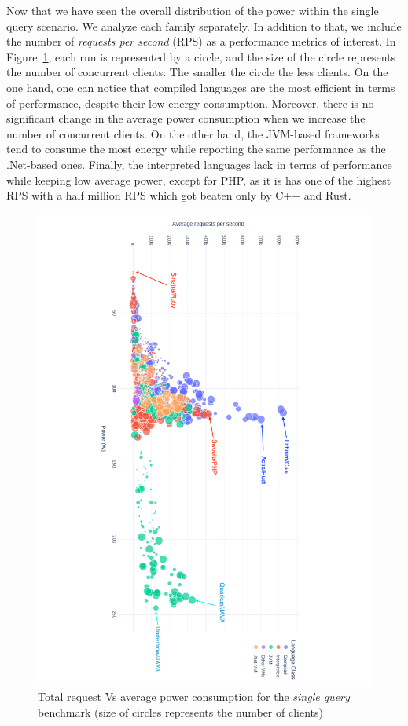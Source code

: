 Now that we have seen the overall distribution of the power within the single query scenario.
We analyze each family separately.
In addition to that, we include the number of \emph{requests per second} (RPS) as a performance metrics of interest.
In Figure~\ref{fig:power_requests_db}, each run is represented by a circle, and the size of the circle represents the number of concurrent clients: The smaller the circle the less clients.
On the one hand, one can notice that compiled languages are the most efficient in terms of performance, despite their low energy consumption.
Moreover, there is no significant change in the average power consumption when we increase the number of concurrent clients.
On the other hand, the JVM-based frameworks tend to consume the most energy while reporting the same performance as the .Net-based ones.
Finally, the interpreted languages lack in terms of performance while keeping low average power, except for PHP, as it is has one of the highest RPS with a half million RPS which got beaten only by C++ and Rust.

\begin{figure}[hbt]
    \includegraphics[height=\textwidth,width=\textheight,keepaspectratio,angle=90]{imgs/power_requests_db}
    \caption{Total request Vs average power consumption for the \emph{single query} benchmark (size of circles represents the number of clients)}
    \label{fig:power_requests_db}
\end{figure}

